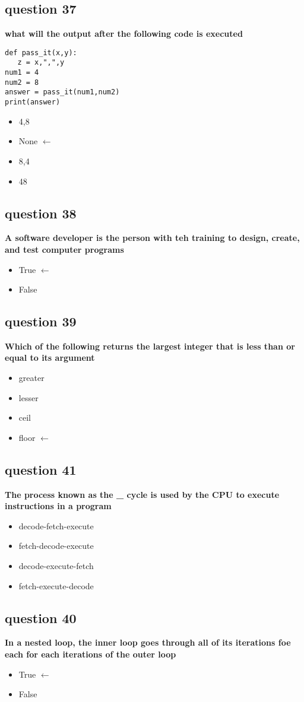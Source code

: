 \documentclass[10pt]{article}
\begin{document}
\subsection*{question 37}
\textbf{what will the output after the following code is executed}
\begin{verbatim}
def pass_it(x,y):
   z = x,",",y
num1 = 4
num2 = 8
answer = pass_it(num1,num2)
print(answer)
\end{verbatim}
\begin{itemize}
\item 4,8
\item None $\leftarrow$
\item 8,4
\item 48
\end{itemize}
\subsection*{question 38}
\textbf{A software developer is the person with teh training to design, create, and test computer programs}
\begin{itemize}
\item True $\leftarrow$
\item False
\end{itemize}
\subsection*{question 39}
\textbf{Which of the following returns the largest integer that is less than or equal to its argument}
\begin{itemize}
\item greater
\item lesser
\item ceil
\item floor $\leftarrow$
\end{itemize}
\subsection*{question 41}
\textbf{The process known as the \_ cycle is used by the CPU to execute instructions in a program}
\begin{itemize}
\item decode-fetch-execute 
\item fetch-decode-execute
\item decode-execute-fetch
\item fetch-execute-decode
\end{itemize}
\subsection*{question 40}
\textbf{In a nested loop, the inner loop goes through all of its iterations foe each for each iterations of the outer loop}
\begin{itemize}
\item True $\leftarrow$
\item False
\end{itemize}
\end{document}
